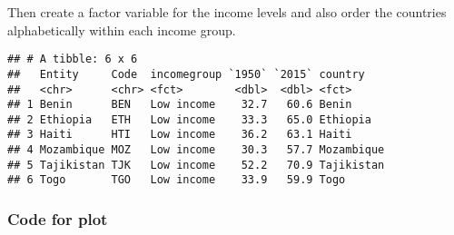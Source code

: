 \documentclass[]{book}
\newenvironment{Shaded}{\begin{snugshade}}{\end{snugshade}}
\newcommand{\DataTypeTok}[1]{\textcolor[rgb]{0.13,0.29,0.53}{#1}}
\newcommand{\KeywordTok}[1]{\textcolor[rgb]{0.13,0.29,0.53}{\textbf{#1}}}
\newcommand{\NormalTok}[1]{#1}
\newcommand{\OperatorTok}[1]{\textcolor[rgb]{0.81,0.36,0.00}{\textbf{#1}}}
\newcommand{\StringTok}[1]{\textcolor[rgb]{0.31,0.60,0.02}{#1}}
\begin{document}
Then create a factor variable for the income levels and also order the countries alphabetically within each income group.

\begin{Shaded}
\end{Shaded}

\begin{verbatim}
## # A tibble: 6 x 6
##   Entity     Code  incomegroup `1950` `2015` country   
##   <chr>      <chr> <fct>        <dbl>  <dbl> <fct>     
## 1 Benin      BEN   Low income    32.7   60.6 Benin     
## 2 Ethiopia   ETH   Low income    33.3   65.0 Ethiopia  
## 3 Haiti      HTI   Low income    36.2   63.1 Haiti     
## 4 Mozambique MOZ   Low income    30.3   57.7 Mozambique
## 5 Tajikistan TJK   Low income    52.2   70.9 Tajikistan
## 6 Togo       TGO   Low income    33.9   59.9 Togo
\end{verbatim}

\hypertarget{lifexcountriescode}{%
\subsubsection*{Code for plot}\label{lifexcountriescode}}
\end{document}

